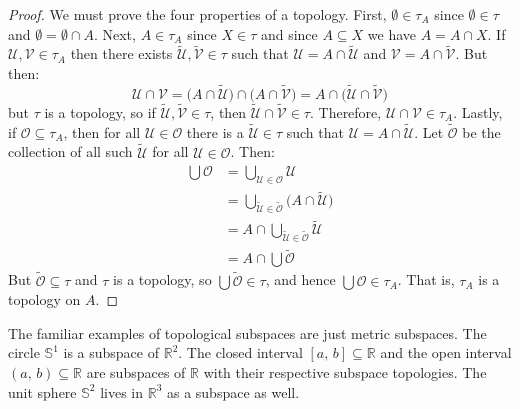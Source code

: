 \documentclass{article}
\theoremstyle{plain}
\theoremstyle{normal}
\newenvironment{example}{%
    \pushQED{\qed}\renewcommand{\qedsymbol}{$\blacksquare$}\examplex%
}{%
    \popQED\endexamplex%
}
\begin{document}
        \begin{proof}
            We must prove the four properties of a topology. First,
            $\emptyset\in\tau_{A}$ since $\emptyset\in\tau$ and
            $\emptyset=\emptyset\cap{A}$. Next, $A\in\tau_{A}$ since
            $X\in\tau$ and since $A\subseteq{X}$ we have $A=A\cap{X}$.
            If $\mathcal{U},\mathcal{V}\in\tau_{A}$ then there exists
            $\tilde{\mathcal{U}},\tilde{\mathcal{V}}\in\tau$ such that
            $\mathcal{U}=A\cap\tilde{\mathcal{U}}$ and
            $\mathcal{V}=A\cap\tilde{\mathcal{V}}$. But then:
            \begin{equation}
                \mathcal{U}\cap\mathcal{V}
                =\big(A\cap\tilde{\mathcal{U}}\big)\cap
                \big(A\cap\tilde{\mathcal{V}}\big)
                =A\cap\big(\tilde{\mathcal{U}}\cap\tilde{\mathcal{V}}\big)
            \end{equation}
            but $\tau$ is a topology, so if
            $\tilde{\mathcal{U}},\tilde{\mathcal{V}}\in\tau$, then
            $\tilde{\mathcal{U}}\cap\tilde{\mathcal{V}}\in\tau$. Therefore,
            $\mathcal{U}\cap\mathcal{V}\in\tau_{A}$. Lastly, if
            $\mathcal{O}\subseteq\tau_{A}$, then for all
            $\mathcal{U}\in\mathcal{O}$ there is a
            $\tilde{\mathcal{U}}\in\tau$ such that
            $\mathcal{U}=A\cap\tilde{\mathcal{U}}$. Let $\tilde{\mathcal{O}}$
            be the collection of all such $\tilde{\mathcal{U}}$ for all
            $\mathcal{U}\in\mathcal{O}$. Then:
            \begin{align}
                \bigcup\mathcal{O}
                &=\bigcup_{\mathcal{U}\in\mathcal{O}}\mathcal{U}\\
                &=\bigcup_{\tilde{\mathcal{U}}\in\tilde{\mathcal{O}}}
                    \big(A\cap\tilde{\mathcal{U}}\big)\\
                &=A\cap\bigcup_{\tilde{\mathcal{U}}\in\tilde{\mathcal{O}}}
                    \tilde{\mathcal{U}}\\
                &=A\cap\bigcup\tilde{\mathcal{O}}
            \end{align}
            But $\tilde{\mathcal{O}}\subseteq\tau$ and $\tau$ is a topology,
            so $\bigcup\tilde{\mathcal{O}}\in\tau$, and hence
            $\bigcup\mathcal{O}\in\tau_{A}$. That is, $\tau_{A}$ is a
            topology on $A$.
        \end{proof}
        \begin{example}
            The familiar examples of topological subspaces are just metric
            subspaces. The circle $\mathbb{S}^{1}$ is a subspace of
            $\mathbb{R}^{2}$. The closed interval $[a,\,b]\subseteq\mathbb{R}$
            and the open interval $(a,\,b)\subseteq\mathbb{R}$ are
            subspaces of $\mathbb{R}$ with their respective subspace topologies.
            The unit sphere $\mathbb{S}^{2}$ lives in $\mathbb{R}^{3}$ as a
            subspace as well.
        \end{example}
\end{document}
